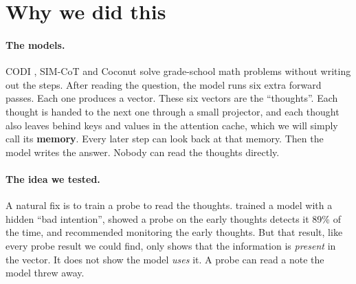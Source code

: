 \documentclass{article}
\begin{document}
\begin{abstract}
case: retraining the backdoored model so that its answer cannot read the prompt makes the thoughts carry the behaviour, at the cost of the written reasoning; on that model, steering the thoughts along the direction a probe reads still changes nothing, while steering along the direction the classes actually differ on removes the backdoor's effect with no damage to the text. Scored as thought safety, the share of runs whose written reasoning is immoral, the arming is real in the model's own text and travels through the prompt's memory, not through the thoughts: swapping in clean thoughts cleans nothing, swapping in clean prompt entries cleans everything.
\end{abstract}

\section{Why we did this}

\paragraph{The models.} CODI \citep{shen2025codi}, SIM-CoT \citep{wei2026simcot} and Coconut \citep{hao2024coconut} solve grade-school math problems without writing out the steps. After reading the question, the model runs six extra forward passes. Each one produces a vector. These six vectors are the ``thoughts''. Each thought is handed to the next one through a small projector, and each thought also leaves behind keys and values in the attention cache, which we will simply call its \textbf{memory}. Every later step can look back at that memory. Then the model writes the answer. Nobody can read the thoughts directly.

\paragraph{The idea we tested.} A natural fix is to train a probe to read the thoughts. \citet{ramjee2026ulterior} trained a model with a hidden ``bad intention'', showed a probe on the early thoughts detects it 89\% of the time, and recommended monitoring the early thoughts. But that result, like every probe result we could find, only shows that the information is \emph{present} in the vector. It does not show the model \emph{uses} it. A probe can read a note the model threw away.
\end{document}
